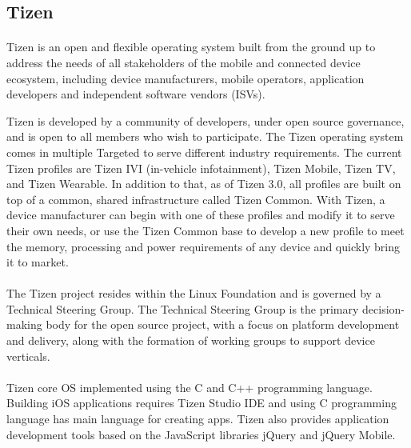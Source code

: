 \subsection{Tizen}

\paragraph{}
Tizen is an open and flexible operating system built from the ground up to address the needs of all stakeholders of the mobile and connected device ecosystem,
including device manufacturers, mobile operators, application developers and independent software vendors (ISVs).

Tizen is developed by a community of developers, under open source governance, and is open to all members who wish to participate.
The Tizen operating system comes in multiple Targeted to serve different industry requirements. The current Tizen profiles are Tizen IVI (in-vehicle infotainment), Tizen Mobile, Tizen TV, and Tizen Wearable.
In addition to that, as of Tizen 3.0, all profiles are built on top of a common, shared infrastructure called Tizen Common.
With Tizen, a device manufacturer can begin with one of these profiles and modify it to serve their own needs, or use the Tizen Common base to develop a new profile to meet the memory, processing and power requirements of any device and quickly bring it to market.

\paragraph{}
The Tizen project resides within the Linux Foundation and is governed by a Technical Steering Group.
The Technical Steering Group is the primary decision-making body for the open source project, with a focus on platform development and delivery, along with the formation of working groups to support device verticals.

\paragraph{}

Tizen core OS implemented using the C and C++ programming language. Building iOS applications requires  Tizen Studio IDE and using  C programming language has main language for creating apps.
Tizen also provides application development tools based on the JavaScript libraries jQuery and jQuery Mobile.

